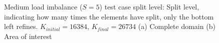 \begin{figure}[H]
    \centering
    \hfill
    \caption{Medium load imbalance (\(S = 5\)) test case split level: Split level, indicating how many times the elements have split, only the bottom left refines. \(K_{initial} = 16384\), \(K_{final} = 26734\) (a) Complete domain (b) Area of interest}\label{fig:load_imbalance_case_medium_s}
\end{figure}

